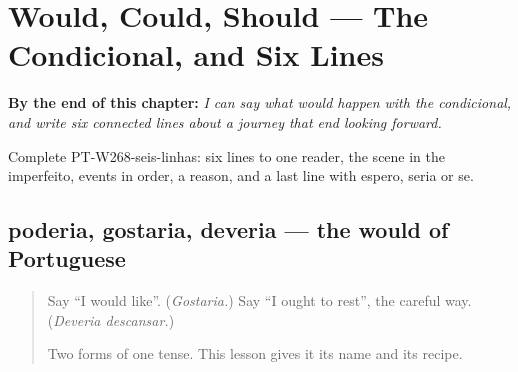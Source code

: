 
\chapter{Would, Could, Should --- The Condicional, and Six Lines}
\label{ch:pt-the-condicional}

\begin{chapteropening}
\textbf{By the end of this chapter:} \emph{I can say what would happen with the condicional, and write six connected lines about a journey that end looking forward.}

Complete PT-W268-seis-linhas: six lines to one reader, the scene in the imperfeito, events in order, a reason, and a last line with espero, seria or se.
\end{chapteropening}

\section[poderia, gostaria, deveria]{poderia, gostaria, deveria — the would of Portuguese}

\label{lesson:PT-C268-poderia}



\begin{quote}
Say \textquotedblleft{}I would like\textquotedblright{}. (\emph{Gostaria.}) Say \textquotedblleft{}I ought to rest\textquotedblright{}, the careful way. (\emph{Deveria descansar.})

Two forms of one tense. This lesson gives it its name and its recipe.
\end{quote}

